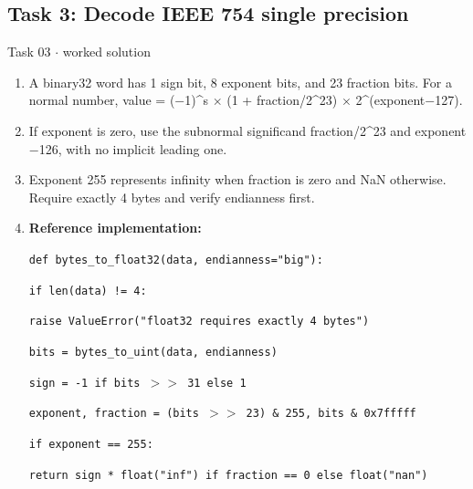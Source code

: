 \documentclass[11pt]{article}
\begin{document}
\begin{keepsection}\subsection{Task 3: Decode IEEE 754 single precision}

\begin{workedbox}{Task 03 \ensuremath{\cdot} worked solution}
\begin{enumerate}
\item A binary32 word has 1 sign bit, 8 exponent bits, and 23 fraction bits. For a normal number, value = (\ensuremath{-}1)\textasciicircum{}s \ensuremath{\times} (1 + fraction/2\textasciicircum{}23) \ensuremath{\times} 2\textasciicircum{}(exponent\ensuremath{-}127).
\item If exponent is zero, use the subnormal significand fraction/2\textasciicircum{}23 and exponent \ensuremath{-}126, with no implicit leading one.
\item Exponent 255 represents infinity when fraction is zero and NaN otherwise. Require exactly 4 bytes and verify endianness first.
\item {}
\textbf{Reference implementation:}
\begin{tcolorbox}[colback=Paperblue,colframe=Paperblue,boxrule=0pt,arc=0pt,left=7pt,right=7pt,top=5pt,bottom=5pt]\small\sloppy
\noindent\hspace*{0em}\texttt{def bytes\_to\_float32(data, endianness="big"):}\par
\noindent\hspace*{1em}\texttt{if len(data) != 4:}\par
\noindent\hspace*{3em}\texttt{raise ValueError("float32 requires exactly 4 bytes")}\par
\noindent\hspace*{1em}\texttt{bits = bytes\_to\_uint(data, endianness)}\par
\noindent\hspace*{1em}\texttt{sign = -1 if bits \ensuremath{>}\ensuremath{>} 31 else 1}\par
\noindent\hspace*{1em}\texttt{exponent, fraction = (bits \ensuremath{>}\ensuremath{>} 23) \& 255, bits \& 0x7fffff}\par
\noindent\hspace*{1em}\texttt{if exponent == 255:}\par
\noindent\hspace*{3em}\texttt{return sign * float("inf") if fraction == 0 else float("nan")}\par

\end{tcolorbox}
\end{enumerate}
\end{workedbox}
\end{keepsection}
\end{document}
